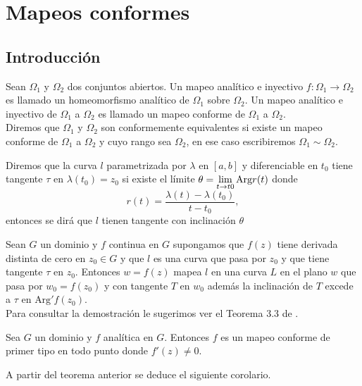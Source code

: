 \chapter{Mapeos conformes} \label{chap:background}
\section{Introducción}\label{introcap2}
\begin{defi}
	Sean $\Omega_{1}$ y $\Omega_{2}$ dos conjuntos abiertos. Un mapeo analítico e inyectivo $f:\Omega_{1}\rightarrow\Omega_{2}$  es llamado un homeomorfismo analítico de  $\Omega_{1}$ sobre $\Omega_{2}$. Un mapeo analítico e inyectivo de $\Omega_{1}$ a $\Omega_{2}$ es llamado un mapeo conforme de $\Omega_{1}$ a $\Omega_{2}$.\\
	Diremos que $\Omega_{1}$ y $\Omega_{2}$ son conformemente equivalentes si existe un mapeo conforme de $\Omega_{1}$ a $\Omega_{2}$ y cuyo rango sea $\Omega_{2}$, en ese caso escribiremos $\Omega_{1} \sim\Omega_{2}$.
\end{defi}
\begin{defi}
	Diremos que la curva $l$ parametrizada por $\lambda$ en $[a,b]$ y diferenciable en $t_0$ tiene tangente $\tau$ en $\lambda(t_0) = z_0$ si existe el límite $\theta = \displaystyle\lim_{t\rightarrow t0}\mbox{Arg}r(t)$  donde
	$$r(t)=\dfrac{\lambda(t)-\lambda(t_0)}{t-t_0},$$ entonces se dirá que $l$ tienen tangente con inclinación $\theta$
\end{defi}

\begin{teor}
	Sean $G$ un dominio y $f$ continua en $G$ supongamos que $f(z)$ tiene derivada
	distinta de cero en $z_0 \in G$ y que $l$ es una curva que pasa por $z_0$ y que tiene tangente $\tau$ en
	$z_0$. Entonces $w = f(z)$ mapea $l$ en una curva $L$ en el plano $w$ que pasa por $w_0 = f(z_0)$ y con
	tangente $T$ en $w_0$ además la inclinación de $T$ excede a $\tau$ en $\mbox{Arg}'f(z_0)$.\\
	Para consultar la demostración le sugerimos ver el Teorema 3.3 de \cite{silverman}.
\end{teor}

\begin{teor}
	Sea $G$ un dominio y $f$ analítica en $G$. Entonces $f$ es un mapeo conforme de primer
	tipo en todo punto donde $f'(z) \neq 0$.
\end{teor}

\noindent A partir del teorema anterior se deduce el siguiente corolario.


